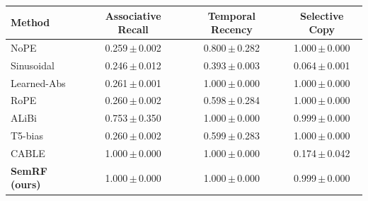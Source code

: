 \begin{tabular}{lccc}
\toprule
Method & Associative Recall & Temporal Recency & Selective Copy \\
\midrule
NoPE & 0.259\,$\pm$\,0.002 & 0.800\,$\pm$\,0.282 & 1.000\,$\pm$\,0.000 \\
Sinusoidal & 0.246\,$\pm$\,0.012 & 0.393\,$\pm$\,0.003 & 0.064\,$\pm$\,0.001 \\
Learned-Abs & 0.261\,$\pm$\,0.001 & 1.000\,$\pm$\,0.000 & 1.000\,$\pm$\,0.000 \\
RoPE & 0.260\,$\pm$\,0.002 & 0.598\,$\pm$\,0.284 & 1.000\,$\pm$\,0.000 \\
ALiBi & 0.753\,$\pm$\,0.350 & 1.000\,$\pm$\,0.000 & 0.999\,$\pm$\,0.000 \\
T5-bias & 0.260\,$\pm$\,0.002 & 0.599\,$\pm$\,0.283 & 1.000\,$\pm$\,0.000 \\
CABLE & 1.000\,$\pm$\,0.000 & 1.000\,$\pm$\,0.000 & 0.174\,$\pm$\,0.042 \\
\textbf{SemRF (ours)} & 1.000\,$\pm$\,0.000 & 1.000\,$\pm$\,0.000 & 0.999\,$\pm$\,0.000 \\
\bottomrule
\end{tabular}